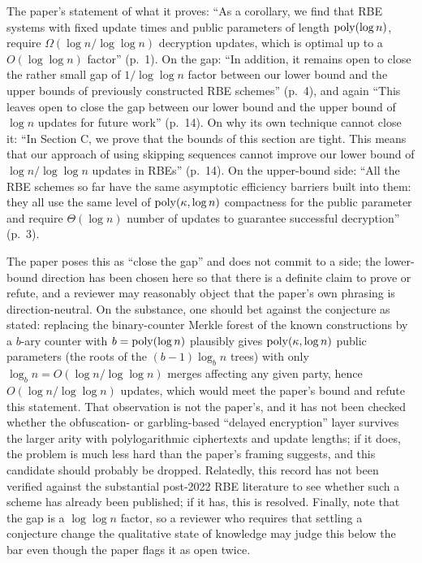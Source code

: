 \documentclass{aicr-conjecture}
\begin{document}
\begin{remark}[Openness]\label{rem:open}
The paper's statement of what it proves: ``As a corollary, we find that
RBE systems with fixed update times and public parameters of length
$\mathrm{poly}(\log n)$, require $\Omega(\log n/\log\log n)$ decryption
updates, which is optimal up to a $O(\log\log n)$ factor'' (p.~1). On
the gap: ``In addition, it remains open to close the rather small gap of
$1/\log\log n$ factor between our lower bound and the upper bounds of
previously constructed RBE schemes'' (p.~4), and again ``This leaves
open to close the gap between our lower bound and the upper bound of
$\log n$ updates for future work'' (p.~14). On why its own technique
cannot close it: ``In Section C, we prove that the bounds of this
section are tight. This means that our approach of using skipping
sequences cannot improve our lower bound of $\log n/\log\log n$ updates
in RBEs'' (p.~14). On the upper-bound side: ``All the RBE schemes so far
have the same asymptotic efficiency barriers built into them: they all
use the same level of $\mathrm{poly}(\kappa,\log n)$ compactness for the public
parameter and require $\Theta(\log n)$ number of updates to guarantee
successful decryption'' (p.~3).
\end{remark}

\begin{remark}\label{rem:caveats}
The paper poses this as ``close the gap'' and does not commit to a side;
the lower-bound direction has been chosen here so that there is a
definite claim to prove or refute, and a reviewer may reasonably object
that the paper's own phrasing is direction-neutral. On the substance,
one should bet against the conjecture as stated: replacing the
binary-counter Merkle forest of the known constructions by a $b$-ary
counter with $b = \mathrm{poly}(\log n)$ plausibly gives
$\mathrm{poly}(\kappa,\log n)$ public parameters (the roots of the
$(b-1)\log_b n$ trees) with only $\log_b n = O(\log n/\log\log n)$
merges affecting any given party, hence $O(\log n/\log\log n)$ updates,
which would meet the paper's bound and refute this statement. That
observation is not the paper's, and it has not been checked whether the
obfuscation- or garbling-based ``delayed encryption'' layer survives the
larger arity with polylogarithmic ciphertexts and update lengths; if it
does, the problem is much less hard than the paper's framing suggests,
and this candidate should probably be dropped. Relatedly, this record
has not been verified against the substantial post-2022 RBE literature
to see whether such a scheme has already been published; if it has, this
is resolved. Finally, note that the gap is a $\log\log n$ factor, so a
reviewer who requires that settling a conjecture change the qualitative
state of knowledge may judge this below the bar even though the paper
flags it as open twice.
\end{remark}
\end{document}
